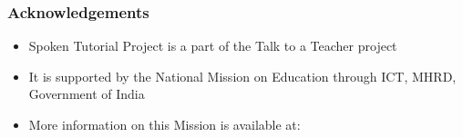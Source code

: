 \documentclass[17pt]{beamer}
\begin{document}
\begin{frame}
\frametitle{Acknowledgements}
\begin{itemize}
\item Spoken Tutorial Project is a part of the Talk to a Teacher  project 
\item It is supported by the National Mission on Education through  ICT, MHRD, Government of India 
\item More information on this Mission is available at: \\ 
\end{itemize}
\end{frame}
\end{document}
